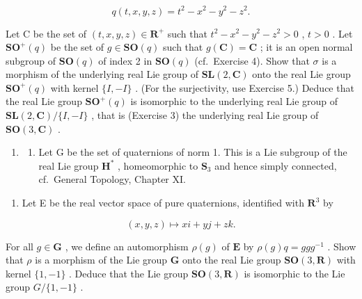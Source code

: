 \[
q (t, x, y, z) = t ^ {2} - x ^ {2} - y ^ {2} - z ^ {2}.
\]

Let C be the set of \((t, x, y, z) \in \mathbf{R}^+\) such that \(t^2 - x^2 - y^2 - z^2 > 0\) , \(t > 0\) . Let \(\mathbf{SO}^+(q)\) be the set of \(g \in \mathbf{SO}(q)\) such that \(g(\mathbf{C}) = \mathbf{C}\) ; it is an open normal subgroup of \(\mathbf{SO}(q)\) of index 2 in \(\mathbf{SO}(q)\) (cf.~Exercise 4). Show that \(\sigma\) is a morphism of the underlying real Lie group of \(\mathbf{SL}(2, \mathbf{C})\) onto the real Lie group \(\mathbf{SO}^+(q)\) with kernel \(\{I, -I\}\) . (For the surjectivity, use Exercise 5.) Deduce that the real Lie group \(\mathbf{SO}^+(q)\) is isomorphic to the underlying real Lie group of \(\mathbf{SL}(2, \mathbf{C}) / \{I, -I\}\) , that is (Exercise 3) the underlying real Lie group of \(\mathbf{SO}(3, \mathbf{C})\) .

\begin{enumerate}
\def\labelenumi{\arabic{enumi}.}
\setcounter{enumi}{6}
\tightlist
\item
  \begin{enumerate}
  \def\labelenumii{(\alph{enumii})}
  \tightlist
  \item
    Let G be the set of quaternions of norm 1. This is a Lie subgroup of the real Lie group \(\mathbf{H}^*\) , homeomorphic to \(\mathbf{S}_3\) and hence simply connected, cf.~General Topology, Chapter XI.
  \end{enumerate}
\end{enumerate}

\begin{enumerate}
\def\labelenumi{(\alph{enumi})}
\setcounter{enumi}{1}
\tightlist
\item
  Let E be the real vector space of pure quaternions, identified with \(\mathbf{R}^3\) by
\end{enumerate}

\[
(x, y, z) \mapsto x i + y j + z k.
\]

For all \(g \in \mathbf{G}\) , we define an automorphism \(\rho(g)\) of \(\mathbf{E}\) by \(\rho(g)q = ggg^{-1}\) . Show that \(\rho\) is a morphism of the Lie group \(\mathbf{G}\) onto the real Lie group \(\mathbf{SO}(3, \mathbf{R})\) with kernel \(\{1, -1\}\) . Deduce that the Lie group \(\mathbf{SO}(3, \mathbf{R})\) is isomorphic to the Lie group \(G / \{1, -1\}\) .

